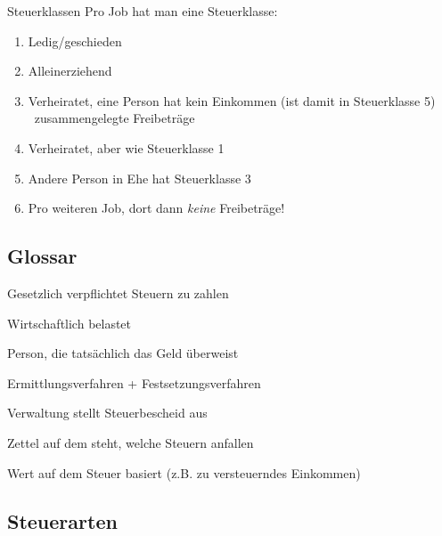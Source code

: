 \documentclass{beamer}
\begin{document}
			\begin{frame}{Steuerklassen}
				Pro Job hat man eine Steuerklasse:
				\begin{enumerate}[I]
					\item Ledig/geschieden
					\item Alleinerziehend
					\item Verheiratet, eine Person hat kein Einkommen (ist damit in Steuerklasse 5) \textrightarrow\ zusammengelegte Freibeträge
					\item Verheiratet, aber wie Steuerklasse 1
					\item Andere Person in Ehe hat Steuerklasse 3
					\item Pro weiteren Job, dort dann \textit{keine} Freibeträge!
				\end{enumerate}
			\end{frame}
	
		\subsection{Glossar}
	
			\begin{frame}
				\begin{description}[Steuerfestsetzung]
					\item[Steuerschuldner] Gesetzlich verpflichtet Steuern zu zahlen
					\item[Steuerträger] Wirtschaftlich belastet
					\item[Steuerzahler] Person, die tatsächlich das Geld überweist
					\pause
					\item[Veranlagung] Ermittlungsverfahren + Festsetzungsverfahren
					\item[Steuerfestsetzung] Verwaltung stellt Steuerbescheid aus
					\pause
					\item[Steuerbescheid] Zettel auf dem steht, welche Steuern anfallen
					\item[Bemessungsgrundlage] Wert auf dem Steuer basiert (z.B. zu versteuerndes Einkommen)
				\end{description}
			\end{frame}
	
		\subsection{Steuerarten}
		
\end{document}
